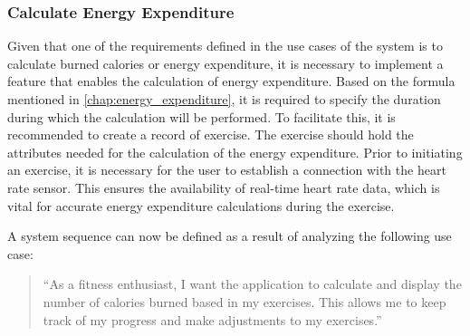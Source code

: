\subsubsection{Calculate Energy Expenditure}
\label{chap:burnedcalories_design}
Given that one of the requirements defined in the use cases of the system is to calculate burned calories or energy expenditure, it is necessary to implement a feature that enables the calculation of energy expenditure. 
Based on the formula mentioned in \autoref{chap:energy_expenditure}, it is required to specify the duration during which the calculation will be performed. 
To facilitate this, it is recommended to create a record of exercise. The exercise should hold the attributes needed for the calculation of the energy expenditure.
Prior to initiating an exercise, it is necessary for the user to establish a connection with the heart rate sensor. This ensures the availability of real-time heart rate data, which is vital for accurate energy expenditure calculations during the exercise.

A system sequence can now be defined as a result of analyzing the following use case:
\begin{quotation}
    \enquote{As a fitness enthusiast, I want the application to calculate and display the number of calories burned based in my exercises. This allows me to keep track of my progress and make adjustments to my exercises.} 
\end{quotation}

